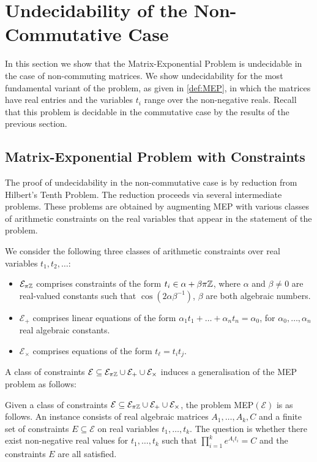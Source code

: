 \section{Undecidability of the Non-Commutative Case}

In this section we show that the Matrix-Exponential Problem is
undecidable in the case of non-commuting matrices.  We show
undecidability for the most fundamental variant of the problem, as
given in \cref{def:MEP}, in which the matrices have real
entries and the variables $t_i$ range over the non-negative reals.
Recall that this problem is decidable in the commutative case by the
results of the previous section.

\subsection{Matrix-Exponential Problem with Constraints}

The proof of undecidability in the non-commutative case is by
reduction from Hilbert's Tenth Problem.  The reduction proceeds via
several intermediate problems.  These problems are obtained by
augmenting MEP with various classes of arithmetic constraints on the
real variables that appear in the statement of the problem.

\begin{definition}
  We consider the following three classes of arithmetic constraints
  over real variables $t_1,t_2,\ldots$:
\begin{itemize}
\item $\mathcal{E}_{\pi\mathbb{Z}}$ comprises constraints of the form
  $t_i\in\alpha+\beta\pi\mathbb{Z}$, where $\alpha$ and $\beta\neq 0$
  are real-valued constants such that $\cos(2\alpha\beta^{-1})$,
  $\beta$ are both algebraic numbers.
\item $\mathcal{E}_{+}$ comprises linear equations of the form
  $\alpha_1 t_1 + \ldots + \alpha_n t_n = \alpha_0 $, for
  $\alpha_0,\ldots,\alpha_n$ real algebraic constants.
\item $\mathcal{E}_{\times}$ comprises equations of the form
  $t_\ell=t_it_j$.
\end{itemize}
\end{definition}

A class of constraints $\mathcal{E} \subseteq \mathcal{E}_{\pi\mathbb{Z}} \cup
\mathcal{E}_{+}\cup \mathcal{E}_{\times}$
induces a generalisation of the MEP problem as follows:
\begin{definition}
  Given a class of constraints
  $\mathcal{E} \subseteq \mathcal{E}_{\pi\mathbb{Z}} \cup
  \mathcal{E}_{+}\cup \mathcal{E}_{\times}$,
  the problem MEP$(\mathcal{E})$ is as follows.  An instance consists
  of real algebraic matrices $A_1,\ldots,A_k,C$ and a finite set of
  constraints $E\subseteq\mathcal{E}$ on real variables
  $t_1,\ldots,t_k$.  The question is whether there exist non-negative
  real values for $t_1,\ldots,t_k$ such that
  $\prod_{i=1}^ke^{A_it_i}=C$ and the constraints $E$ are all
  satisfied.
\label{def:contraintMEP}
\end{definition}

